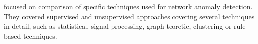%
 \cite{gogoi2011survey} focused on comparison of specific techniques used for network anomaly
detection. They covered supervised and unsupervised approaches covering several techniques in detail, such as
statistical, signal processing, graph teoretic, clustering  or rule-based techniques.


